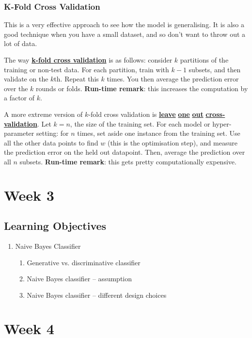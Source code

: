 \documentclass[11pt]{scrartcl}
\theoremstyle{definition}
\theoremstyle{remark}
\newcommand{\dfn}[1]{\textbf{\underline{#1}}}
\begin{document}
\subsubsection{K-Fold Cross Validation}
This is a very effective approach to see how the model is generalising. It is also a good technique when you have a small dataset, and so don't want to throw out a lot of data. 

The way \dfn{k-fold cross validation} is as follows: consider $k$ partitions of the training or non-test data. For each partition, train with $k -1$ subsets, and then validate on the $k$th. Repeat this $k$ times. You then average the prediction error over the $k$ rounds or folds. \textbf{Run-time remark}: this increases the computation by a factor of $k$. 

A more extreme version of $k$-fold cross validation is \dfn{leave} \dfn{one} \dfn{out} \dfn{cross-validation}. Let $k=n$, the size of the training set. For each model or hyper-parameter setting: for $n$ times, set aside one instance from the training set. Use all the other data points to find $w$ (this is the optimisation step), and measure the prediction error on the held out datapoint. Then, average the prediction over all $n$ subsets. \textbf{Run-time remark}: this gets pretty computationally expensive. 


\section{Week 3}

\subsection{Learning Objectives}
\begin{enumerate}
	\item Naive Bayes Classifier 
	\begin{enumerate}[noitemsep]
		\item Generative vs. discriminative classifier 
		\item Naive Bayes classifier -- assumption 
		\item Naive Bayes classifier -- different design choices
	\end{enumerate}
\end{enumerate}

\section{Week 4}
\end{document}

